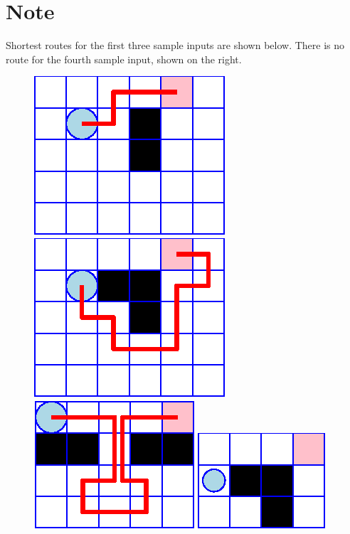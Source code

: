 \section*{Note}
Shortest routes for the first three sample inputs are shown below. There is no route for the fourth sample input, shown on the right.
\begin{figure}[h]
  \includegraphics[scale=0.7]{maze1} \hskip 1cm
  \includegraphics[scale=0.7]{maze2} \hskip 1cm
  \includegraphics[scale=0.7]{maze3} \hskip 1cm
  \includegraphics[scale=0.7]{maze4}
\end{figure}
